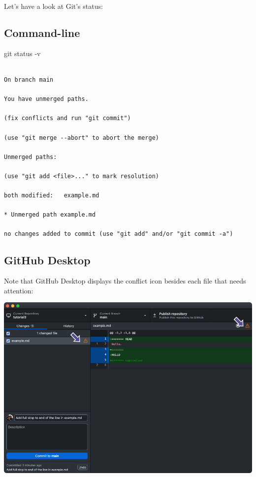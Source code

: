\documentclass[
  letterpaper,
  DIV=11,
  numbers=noendperiod]{scrartcl}
\newenvironment{Shaded}{\begin{snugshade}}{\end{snugshade}}
\newcommand{\NormalTok}[1]{\textcolor[rgb]{0.00,0.23,0.31}{#1}}
\newcommand{\SpecialCharTok}[1]{\textcolor[rgb]{0.37,0.37,0.37}{#1}}
\begin{document}
Let's have a look at Git's status:

\subsection{Command-line}

\begin{Shaded}
\begin{Highlighting}[]
\NormalTok{git status }\SpecialCharTok{{-}}\NormalTok{v}
\end{Highlighting}
\end{Shaded}

\begin{verbatim}

On branch main

You have unmerged paths.

(fix conflicts and run "git commit")

(use "git merge --abort" to abort the merge)

Unmerged paths:

(use "git add <file>..." to mark resolution)

both modified:   example.md

* Unmerged path example.md

no changes added to commit (use "git add" and/or "git commit -a")
\end{verbatim}

\subsection{GitHub Desktop}

Note that GitHub Desktop displays the conflict icon besides each file
that needs attention:

\includegraphics{images/image54.png}
\end{document}
